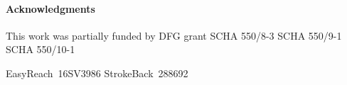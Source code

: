 \paragraph{Acknowledgments}

This work was partially funded 
by 
DFG
grant 
SCHA 550/8-3   %
SCHA 550/9-1   %
SCHA 550/10-1  %

EasyReach~16SV3986
StrokeBack~288692


